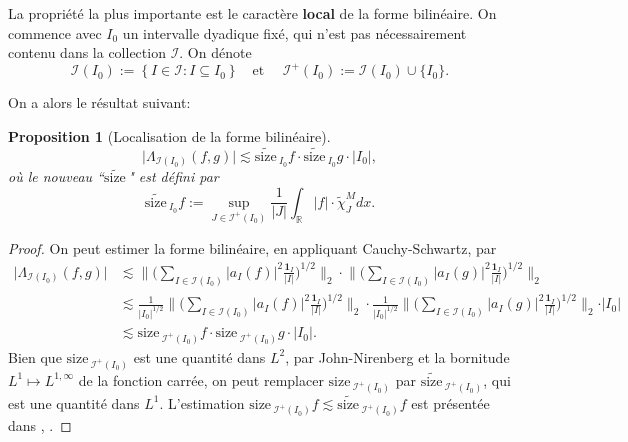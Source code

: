\documentclass[11pt]{amsart}
\newcommand{\ssize}{\text{size}\,}
\newtheorem{proposition}[theorem]{Proposition}
\newcommand{\sssize}{\widetilde{\text{size}\,}}
\newcommand{\one}{\mathbf{1}}
\newcommand{\rr}{\mathbb}
\newcommand{\ii}{\mathscr}
\newcommand{\ci}{\tilde{\chi}}
\begin{document}
La propri\'et\'e la plus importante est le caract\`ere {\bf local} de la forme bilin\'eaire. On commence avec $I_0$ un intervalle dyadique fix\'e,  qui n'est pas n\'ecessairement contenu dans la collection $\ii I$. On d\'enote
\[
\ii I (I_0):=\left \lbrace I \in \ii I : I \subseteq I_0  \right\rbrace \quad \text{et  } \quad \ii I^+ (I_0):=\ii I (I_0) \cup \lbrace I_0 \rbrace.
\]

On a alors le r\'esultat suivant:

\begin{proposition}[Localisation de la forme bilin\'eaire]
\label{prop:local-Hilbert}
\[
\big|\Lambda_{\ii I \left(I_0 \right)}(f, g) \big| \lesssim \sssize_{I_0} f \cdot \sssize_{I_0} g \cdot |I_0|,
\]
o\`u le nouveau ``$\sssize$" est d\'efini par
\[
\sssize_{I_0}f := \sup_{ J \in \ii I^+ \left( I_0 \right)} \frac{1}{|J|} \int_{\rr R} |f| \cdot \ci_{J}^M dx.
\]
\end{proposition}

\begin{proof}
On peut estimer la forme bilin\'eaire, en appliquant Cauchy-Schwartz, par
\begin{align*}
\vert  \Lambda_{\ii I \left(I_0 \right)}(f, g)  \vert &\lesssim \big\|  \big( \sum_{I \in \ii I(I_0)}  \vert a_I(f) \vert^2 \frac{\one_I}{\vert I \vert} \big)^{1/2}\big\|_2 \cdot \big\|  \big( \sum_{I \in \ii I(I_0)}  \vert a_I(g) \vert^2 \frac{\one_I}{\vert I \vert} \big)^{1/2}\big\|_2 \\
& \lesssim \frac{1}{\vert I_0 \vert^{1/2}} \big\|  \big( \sum_{I \in \ii I(I_0)}  \vert a_I(f) \vert^2 \frac{\one_I}{\vert I \vert} \big)^{1/2}\big\|_2 \cdot \frac{1}{\vert I_0 \vert^{1/2}} \big\|  \big( \sum_{I \in \ii I(I_0)}  \vert a_I(g) \vert^2 \frac{\one_I}{\vert I \vert} \big)^{1/2}\big\|_2 \cdot \vert I_0 \vert \\
&\lesssim \ssize_{\ii I^+(I_0)} f \cdot \ssize_{\ii I^+ (I_0)} g \cdot |I_0|.
\end{align*}
Bien que $\ssize_{\ii I^+(I_0)}$ est une quantit\'e dans $L^2$, par John-Nirenberg et la bornitude $L^1 \mapsto L^{1, \infty}$ de la fonction carr\'ee, on peut remplacer $\ssize_{\ii I^+(I_0)}$ par $\sssize_{\ii I^+(I_0)}$, qui est une quantit\'e dans $L^1$. L'estimation $\ssize_{\ii I^+(I_0)}f \lesssim \sssize_{\ii I^+(I_0)} f$ est pr\'esent\'ee dans \cite[Lemma 2.13]{multilinear_harmonic}, \cite[Lemma 4.2]{MTTBiest0}.
\end{proof}
\end{document}
